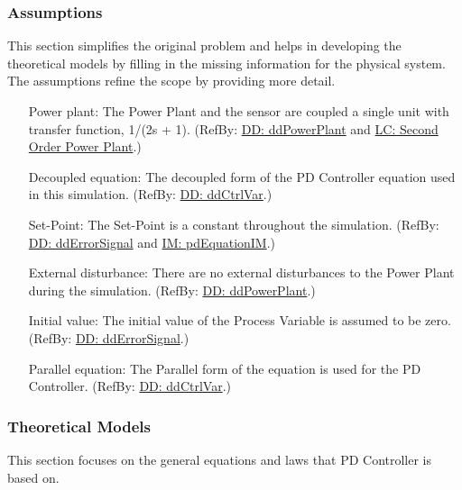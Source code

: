 \documentclass[12pt]{article}
\begin{document}
\subsubsection{Assumptions}
\label{Sec:Assumps}
This section simplifies the original problem and helps in developing the theoretical models by filling in the missing information for the physical system. The assumptions refine the scope by providing more detail.

\begin{itemize}
\item[Power plant:\phantomsection\label{pwrPlant}]{The Power Plant and the sensor are coupled  a single unit with transfer function, 1/(2s + 1). (RefBy: \hyperref[DD:ddPowerPlant]{DD: ddPowerPlant} and \hyperref[likeChgIC]{LC: Second Order Power Plant}.)}
\item[Decoupled equation:\phantomsection\label{decoupled}]{The decoupled form of the PD Controller equation used in this simulation. (RefBy: \hyperref[DD:ddCtrlVar]{DD: ddCtrlVar}.)}
\item[Set-Point:\phantomsection\label{setPoint}]{The Set-Point is a constant throughout the simulation. (RefBy: \hyperref[DD:ddErrorSignal]{DD: ddErrorSignal} and \hyperref[IM:pdEquationIM]{IM: pdEquationIM}.)}
\item[External disturbance:\phantomsection\label{externalDistub}]{There are no external disturbances to the Power Plant during the simulation. (RefBy: \hyperref[DD:ddPowerPlant]{DD: ddPowerPlant}.)}
\item[Initial value:\phantomsection\label{initialValue}]{The initial value of the Process Variable is assumed to be zero. (RefBy: \hyperref[DD:ddErrorSignal]{DD: ddErrorSignal}.)}
\item[Parallel equation:\phantomsection\label{parallelEq}]{The Parallel form of the equation is used for the PD Controller. (RefBy: \hyperref[DD:ddCtrlVar]{DD: ddCtrlVar}.)}
\end{itemize}
\subsubsection{Theoretical Models}
\label{Sec:TMs}
This section focuses on the general equations and laws that PD Controller is based on.
\end{document}
